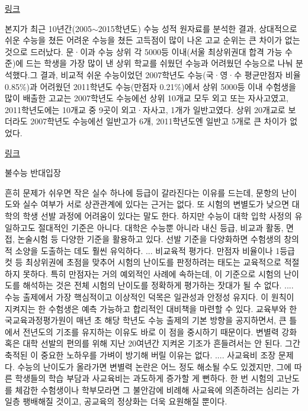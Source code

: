 \vspace{5mm}

\href{http://news.naver.com/main/read.nhn?mode=LSD&mid=sec&sid1=102&oid=023&aid=0003139924}{링크}
\vspace{5mm}

본지가 최근 10년간(2005$\sim$2015학년도) 수능 성적 원자료를 분석한 결과, 상대적으로 쉬운 수능을 쳤든 어려운 수능을 쳤든 고득점이 많이 나온 고교 순위는 큰 차이가 없는 것으로 드러났다. 문·이과 수능 상위 각 5000등 이내(서울 최상위권대 합격 가능 수준)에 드는 학생을 가장 많이 낸 상위 학교를 쉬웠던 수능과 어려웠던 수능으로 나눠 분석했다.그 결과, 비교적 쉬운 수능이었던 2007학년도 수능(국·영·수 평균만점자 비율0.85$\%$)과 어려웠던 2011학년도 수능(만점자 0.21$\%$)에서 상위 5000등 이내 수험생을 많이 배출한 고교는 2007학년도 수능에선 상위 10개교 모두 외고 또는 자사고였고, 2011학년도에는 10개교 중 9곳이 외고·자사고, 1개가 일반고였다. 상위 20개교로 보더라도 2007학년도 수능에선 일반고가 6개, 2011학년도엔 일반고 5개로 큰 차이가 없었다.
\vspace{5mm}

\href{http://news.naver.com/main/read.nhn?mode=LSD&mid=sec&sid1=110&oid=081&aid=0002679818}{링크}
\vspace{5mm}

불수능 반대입장
\vspace{5mm}

흔히 문제가 쉬우면 작은 실수 하나에 등급이 갈라진다는 이유를 드는데, 문항의 난이도와 실수 여부가 서로 상관관계에 있다는 근거는 없다. 또 시험의 변별도가 낮으면 대학의 학생 선발 과정에 어려움이 있다는 말도 한다. 하지만 수능이 대학 입학 사정의 유일하고도 절대적인 기준은 아니다. 대학은 수능뿐 아니라 내신 등급, 비교과 활동, 면접, 논술시험 등 다양한 기준을 활용하고 있다. 선발 기준을 다양화하면 수험생의 창의적 소양을 도출하는 데도 훨씬 유익하다. ... 비교육적 평가다. 만점자 비율이나 1등급 컷 등 최상위권에 초점을 맞추어 시험의 난이도를 판정하려는 태도는 교육적으로 적절하지 못하다. 특히 만점자는 거의 예외적인 사례에 속하는데, 이 기준으로 시험의 난이도를 해석하는 것은 전체 시험의 난이도를 정확하게 평가하는 잣대가 될 수 없다. .... 수능 출제에서 가장 핵심적이고 이상적인 덕목은 일관성과 안정성 유지다. 이 원칙이 지켜지는 한 수험생은 예측 가능하고 합리적인 대비책을 마련할 수 있다. 교육부와 한국교육과정평가원이 매년 초 해당 학년도 수능 출제의 기본 방향을 공지하면서, 큰 틀에서 전년도의 기조를 유지하는 이유도 바로 이 점을 중시하기 때문이다. 변별력 강화 혹은 대학 선발의 편의를 위해 지난 20여년간 지켜온 기조가 흔들려서는 안 된다. 그간 축적된 이 중요한 노하우를 가벼이 방기해 버릴 이유는 없다. .... 사교육비 조장 문제다. 수능의 난이도가 올라가면 변별력 논란은 어느 정도 해소될 수도 있겠지만, 그에 따른 학생들의 학습 부담과 사교육비는 과도하게 증가할 게 뻔하다. 한 번 시험의 고난도를 체감한 수험생이나 학부모라면 그 불안감에 비례해 사교육에 의존하려는 심리는 가일층 팽배해질 것이고, 공교육의 정상화는 더욱 요원해질 뿐이다.
\vspace{5mm}

